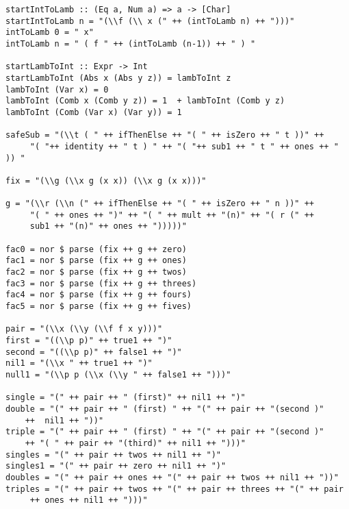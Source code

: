 \documentclass[11pt]{article}
\begin{document}
\begin{verbatim}
startIntToLamb :: (Eq a, Num a) => a -> [Char]
startIntToLamb n = "(\\f (\\ x (" ++ (intToLamb n) ++ ")))"
intToLamb 0 = " x"
intToLamb n = " ( f " ++ (intToLamb (n-1)) ++ " ) " 

startLambToInt :: Expr -> Int
startLambToInt (Abs x (Abs y z)) = lambToInt z
lambToInt (Var x) = 0
lambToInt (Comb x (Comb y z)) = 1  + lambToInt (Comb y z)
lambToInt (Comb (Var x) (Var y)) = 1

safeSub = "(\\t ( " ++ ifThenElse ++ "( " ++ isZero ++ " t ))" ++
     "( "++ identity ++ " t ) " ++ "( "++ sub1 ++ " t " ++ ones ++ " )) "

fix = "(\\g (\\x g (x x)) (\\x g (x x)))"

g = "(\\r (\\n (" ++ ifThenElse ++ "( " ++ isZero ++ " n ))" ++
     "( " ++ ones ++ ")" ++ "( " ++ mult ++ "(n)" ++ "( r (" ++ 
     sub1 ++ "(n)" ++ ones ++ ")))))"

fac0 = nor $ parse (fix ++ g ++ zero)
fac1 = nor $ parse (fix ++ g ++ ones)
fac2 = nor $ parse (fix ++ g ++ twos)
fac3 = nor $ parse (fix ++ g ++ threes)
fac4 = nor $ parse (fix ++ g ++ fours)
fac5 = nor $ parse (fix ++ g ++ fives)

pair = "(\\x (\\y (\\f f x y)))"
first = "((\\p p)" ++ true1 ++ ")"
second = "((\\p p)" ++ false1 ++ ")" 
nil1 = "(\\x " ++ true1 ++ ")"
null1 = "(\\p p (\\x (\\y " ++ false1 ++ ")))"

single = "(" ++ pair ++ " (first)" ++ nil1 ++ ")"
double = "(" ++ pair ++ " (first) " ++ "(" ++ pair ++ "(second )" 
    ++  nil1 ++ "))"
triple = "(" ++ pair ++ " (first) " ++ "(" ++ pair ++ "(second )" 
    ++ "( " ++ pair ++ "(third)" ++ nil1 ++ ")))"
singles = "(" ++ pair ++ twos ++ nil1 ++ ")"
singles1 = "(" ++ pair ++ zero ++ nil1 ++ ")"
doubles = "(" ++ pair ++ ones ++ "(" ++ pair ++ twos ++ nil1 ++ "))" 
triples = "(" ++ pair ++ twos ++ "(" ++ pair ++ threes ++ "(" ++ pair
     ++ ones ++ nil1 ++ ")))"

\end{verbatim}
\end{document}

